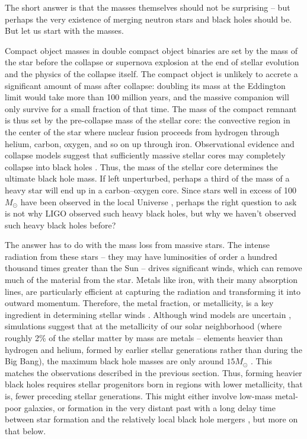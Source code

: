 \documentclass[iop,onecolumn]{revtex4}
\begin{document}
The short answer is that the masses themselves should not be surprising -- but perhaps the very existence of merging neutron stars and black holes should be.  But let us start with the masses.  

Compact object masses in double compact object binaries are set by the mass of the star before the collapse or supernova explosion at the end of stellar evolution and the physics of the collapse itself.  The compact object is unlikely to accrete a significant amount of mass after collapse: doubling its mass at the Eddington limit would take more than 100 million years, and the massive companion will only survive for a small fraction of that time.  The mass of the compact remnant is thus set by the pre-collapse mass of the stellar core: the convective region in the center of the star where nuclear fusion proceeds from hydrogen through helium, carbon, oxygen, and so on up through iron.  Observational evidence and collapse models suggest that sufficiently massive stellar cores may completely collapse into black holes \citep[for a review, see][]{Mirabel:2016}.  Thus, the mass of the stellar core determines the ultimate black hole mass.  If left unperturbed, perhaps a third of the mass of a heavy star will end up in a carbon--oxygen core.  Since stars well in excess of 100 $M_\odot$ have been observed in the local Universe \citep[e.g.,][]{Schneider:2018}, perhaps the right question to ask is not why LIGO observed such heavy black holes, but why we haven't observed such heavy black holes before?  

The answer has to do with the mass loss from massive stars.  The intense radiation from these stars -- they may have luminosities of order a hundred thousand times greater than the Sun -- drives significant winds, which can remove much of the material from the star.  Metals like iron, with their many absorption lines, are particularly efficient at capturing the radiation and transforming it into outward momentum.  Therefore, the metal fraction, or metallicity, is a key ingredient in determining stellar winds \citep{Vink:2001}.  Although wind models are uncertain \citep[e.g.,][]{Renzo:2017}, simulations suggest that at the metallicity of our solar neighborhood (where roughly 2\% of the stellar matter by mass are metals -- elements heavier than hydrogen and helium, formed by earlier stellar generations rather than during the Big Bang), the maximum black hole masses are only around $15 M_\odot$ \citep{Belczynski:2009,Spera:2015}.  This matches the observations described in the previous section.  Thus, forming heavier black holes requires stellar progenitors born in regions with lower metallicity, that is, fewer preceding stellar generations.  This might either involve low-mass metal-poor galaxies, or formation in the very distant past with a long delay time between star formation and the relatively local black hole mergers \citep{Belczynski:2016}, but more on that below.
\end{document}
